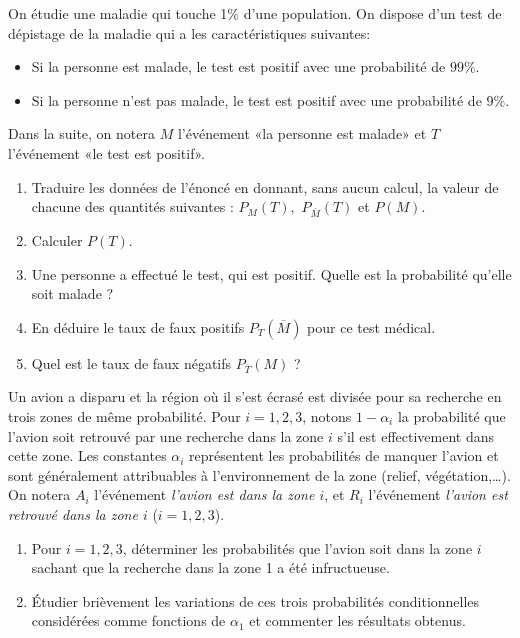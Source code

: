 \documentclass[a4paper,12pt,reqno]{amsart}
\begin{document}
\begin{exo}

  On étudie une maladie qui touche 1$\%$ d'une population. On dispose d'un test  de dépistage de la maladie qui a les caractéristiques suivantes:
  \begin{itemize}
    \item Si la personne est malade, le test est positif avec une probabilité de $99 \%$.
    \item Si la personne n'est pas malade, le test est positif avec une probabilité de $9 \%$.
  \end{itemize}
  Dans la suite, on notera $M$ l'événement «la personne est malade» et $T$ l'événement «le test est positif».

  \begin{enumerate}
    \item Traduire les données de l'énoncé en donnant, sans aucun calcul,  la valeur de chacune des quantités suivantes : $P_M(T),$ $P_{\overline M}(T)$ et $P(M)$.
    \item Calculer $P(T)$.
    \item Une personne a effectué le test, qui est positif. Quelle est la probabilité qu'elle soit malade ?
    \item En déduire le taux de faux positifs $P_T(\overline M)$ pour ce test médical.
    \item Quel est le taux de faux négatifs $P_{\overline T}(M)$ ?
  \end{enumerate}

\end{exo}

\begin{exo}

  Un avion a disparu et la région  où il s'est écrasé est divisée pour sa
  recherche en trois zones de même probabilité. Pour $i=1,2,3$, notons
  $1-\alpha_i$ la probabilité que l'avion soit retrouvé par une recherche
  dans la zone $i$ s'il est effectivement dans cette zone. Les constantes
  $\alpha_i$ représentent les probabilités de manquer l'avion et sont
  généralement attribuables à l'environnement de la zone (relief,
  végétation,\dots). On notera $A_i$ l'événement \emph{l'avion est dans la
  zone $i$}, et $R_i$ l'événement \emph{l'avion est retrouvé dans la zone
  $i$} ($i=1,2,3$).

  \begin{enumerate}
    \item  Pour $i=1,2,3$, déterminer les probabilités que l'avion soit dans la zone $i$ sachant que la recherche dans la zone 1 a été infructueuse.
    \item  Étudier brièvement les variations de ces trois probabilités conditionnelles considérées comme fonctions de $\alpha_1$ et commenter les résultats obtenus.
  \end{enumerate}

\end{exo}
\end{document}
